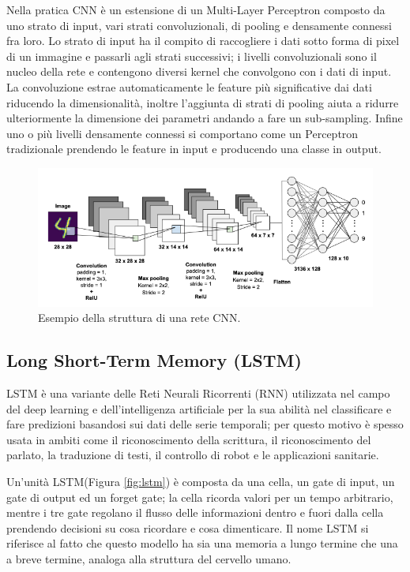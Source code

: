 Nella pratica CNN è un estensione di un Multi-Layer Perceptron composto da uno strato di input, vari strati convoluzionali, di pooling e densamente connessi fra loro. Lo strato di input ha il compito di raccogliere i dati sotto forma di pixel di un immagine e passarli agli strati successivi; i livelli convoluzionali sono il nucleo della rete e contengono diversi kernel che convolgono con i dati di input. La convoluzione estrae automaticamente le feature più significative dai dati riducendo la dimensionalità, inoltre l'aggiunta di strati di pooling aiuta a ridurre ulteriormente la dimensione dei parametri 
andando a fare un sub-sampling. Infine uno o più livelli densamente connessi si comportano come un Perceptron tradizionale prendendo le feature in input e producendo una classe in output.

\begin{figure}[!htb]
    \centering
    \includegraphics[width=\textwidth]{figure/cnn.png}
    \caption{Esempio della struttura di una rete CNN.}
    \label{fig:cnn}
\end{figure}

\subsection{Long Short-Term Memory (LSTM)}
\label{ssec:lstm}

LSTM è una variante delle Reti Neurali Ricorrenti (RNN) utilizzata nel campo del deep learning e dell'intelligenza artificiale per la sua abilità nel classificare e fare predizioni basandosi sui dati delle serie temporali; per questo motivo è spesso usata in ambiti come il riconoscimento della scrittura, il riconoscimento del parlato, la traduzione di testi, il controllo di robot e le applicazioni sanitarie.

Un'unità LSTM(Figura \ref{fig:lstm}) è composta da una cella, un gate di input, un gate di output ed un forget gate; la cella ricorda valori per un tempo arbitrario, mentre i tre gate regolano il flusso delle informazioni dentro e fuori dalla cella prendendo decisioni su cosa ricordare e cosa dimenticare. Il nome LSTM si riferisce al fatto che questo modello ha sia una memoria a lungo termine che una a breve termine, analoga alla struttura del cervello umano.

